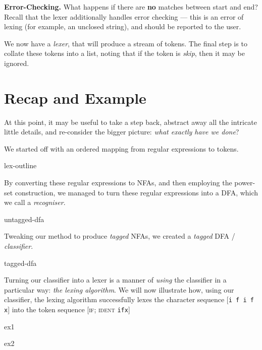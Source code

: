 \textbf{Error-Checking.} What happens if there are \textbf{no} matches between start and end? Recall that the lexer additionally handles error checking --- this is an error of lexing (for example, an unclosed string), and should be reported to the user.

We now have a \emph{lexer}, that will produce a stream of tokens. The final step is to collate these tokens into a list, noting that if the token is \textit{skip}, then it may be ignored. 

\section{Recap and Example}
At this point, it may be useful to take a step back, abstract away all the intricate little details, and re-consider the bigger picture: \textit{what exactly have we done}?

We started off with an ordered mapping from regular expressions to tokens. 

\begin{center}
    {lex-outline}
\end{center}

By converting these regular expressions to NFAs, and then employing the power-set construction, we managed to turn these regular expressions into a DFA, which we call a \emph{recogniser}. 

\begin{center}
{untagged-dfa}
\end{center}

Tweaking our method to produce \emph{tagged} NFAs, we created a \emph{tagged} DFA / \emph{classifier}.

\begin{center}
{tagged-dfa}
\end{center}

Turning our classifier into a lexer is a manner of \emph{using} the classifier in a particular way: \emph{the lexing algorithm}. We will now illustrate how, using our classifier, the lexing algorithm successfully lexes the character sequence [\texttt{i f  i f x}] into the token sequence [\textsc{if}; \textsc{ident} \texttt{ifx}]


\begin{minipage}{0.5\textwidth}
    {ex1}
\end{minipage}%
\begin{minipage}{0.5\textwidth}
    {ex2}
\end{minipage}

